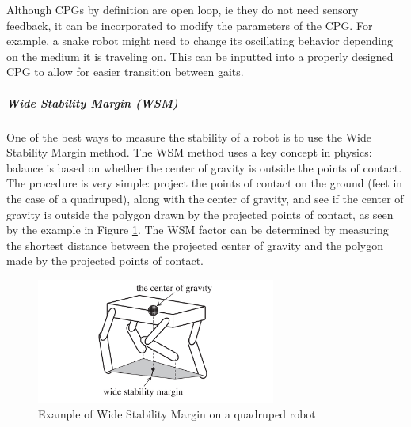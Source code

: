                 Although CPGs by definition are open loop, ie they do not need sensory feedback, it can be incorporated to modify the parameters of the CPG.\cite{CPG_StateOfTheArt} For example, a snake robot might need to change its oscillating behavior depending on the medium it is traveling on. This can be inputted into a properly designed CPG to allow for easier transition between gaits.
            \subparagraph*{Wide Stability Margin (WSM)}
                One of the best ways to measure the stability of a robot is to use the Wide Stability Margin method. The WSM method uses a key concept in physics: balance is based on whether the center of gravity is outside the points of contact. The procedure is very simple: project the points of contact on the ground (feet in the case of a quadruped), along with the center of gravity, and see if the center of gravity is outside the polygon drawn by the projected points of contact, as seen by the example in Figure \ref{fig:wsm_example}.\cite{AdaptiveDynamicWalking} The WSM factor can be determined by measuring the shortest distance between the projected center of gravity and the polygon made by the projected points of contact. 
                \begin{figure}[H]
                    \centering
                    \includegraphics[width=0.7\textwidth]{figures/WideStabilityMargin.png}
                    \caption{Example of Wide Stability Margin on a quadruped robot \cite{AdaptiveDynamicWalking}}
                    \label{fig:wsm_example}
                \end{figure}
